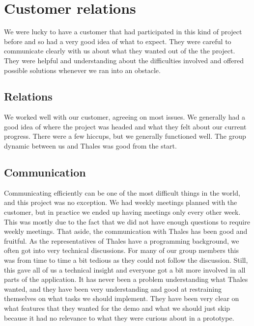 \newpage

\section{Customer relations}\label{sec:refl_customer}
We were lucky to have a customer that had participated in this kind of project before and so had a very good idea of what to expect. They were careful to communicate clearly with us about what they wanted out of the the project. They were helpful and understanding about the difficulties involved and offered possible solutions whenever we ran into an obstacle.
\subsection{Relations}
We worked well with our customer, agreeing on most issues. We generally had a good idea of where the project was headed and what they felt about our current progress. There were a few hiccups, but we generally functioned well. The group dynamic between us and Thales was good from the start.

\subsection{Communication}
Communicating efficiently can be one of the most difficult things in the world, and this project was no exception. We had weekly meetings planned with the customer, but in practice we ended up having meetings only every other week. This was mostly due to the fact that we did not have enough questions to require weekly meetings.
\newline
\newline
That aside, the communication with Thales has been good and fruitful. As the representatives of Thales have a programming background, we often got into very technical discussions. For many of our group members this was from time to time a bit tedious as they could not follow the discussion. Still, this gave all of us a technical insight and everyone got a bit more involved in all parts of the application. It has never been a problem understanding what Thales wanted, and they have been very understanding and good at restraining themselves on what tasks we should implement. They have been very clear on what features that they wanted for the demo and what we should just skip because it had no relevance to what they were curious about in a prototype.

